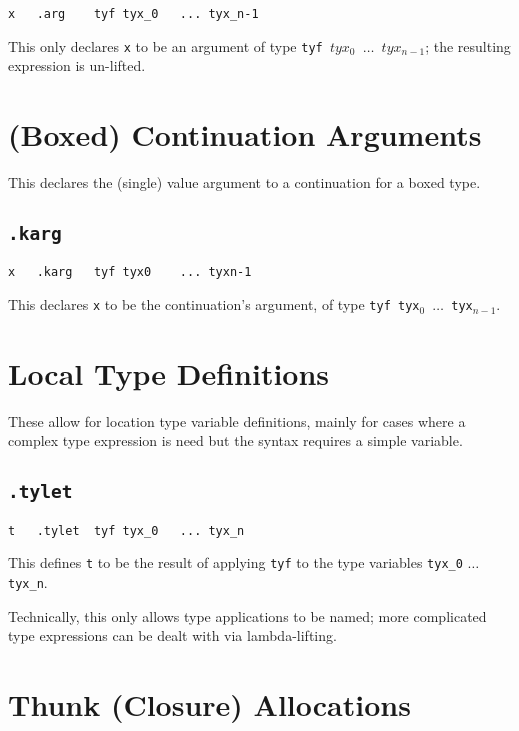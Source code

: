 \documentclass{report}
\newcommand\stringcode[1]{\texttt{#1}}
\begin{document}
\begin{verbatim}
x	.arg	tyf	tyx_0	...	tyx_n-1
\end{verbatim}

This only declares \stringcode{x} to be an argument of type \stringcode{tyf $tyx_0$ $\ldots$ $tyx_{n-1}$};
the resulting expression is un-lifted.

\section{(Boxed) Continuation Arguments}
\label{cont_arg}

This declares the (single) value argument to a continuation for a boxed type.

\subsection{\stringcode{.karg}}

\begin{verbatim}
x	.karg	tyf	tyx0	...	tyxn-1
\end{verbatim}

This declares \stringcode{x} to be the continuation's argument, of type \stringcode{tyf tyx$_0$ $\ldots$ tyx$_{n-1}$}.

\section{Local Type Definitions}
\label{code_type_let}

These allow for location type variable definitions,
mainly for cases where a complex type expression is need but the syntax requires a simple variable.

\subsection{\stringcode{.tylet}}

\begin{verbatim}
t	.tylet	tyf	tyx_0	...	tyx_n
\end{verbatim}

This defines \stringcode{t} to be the result of applying \stringcode{tyf} to the type variables \stringcode{tyx\_0} $\ldots$ \stringcode{tyx\_n}.

Technically, this only allows type applications to be named;
more complicated type expressions can be dealt with via lambda-lifting.

\section{Thunk (Closure) Allocations}
\label{thunk_alloc}
\end{document}
